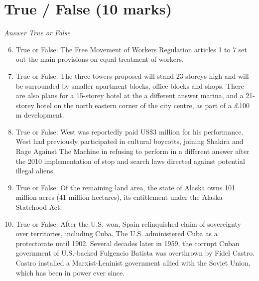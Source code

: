\documentclass[12pt]{article}
\begin{document}
\section*{True / False (10 marks)}
\textit{Answer True or False}
\begin{enumerate}[label=\arabic*.]
\setcounter{enumi}{5}
\item True or False: The Free Movement of Workers Regulation articles 1 to 7 set out the main provisions on equal treatment of workers.
\item True or False: The three towers proposed will stand 23 storeys high and will be surrounded by smaller apartment blocks, office blocks and shops. There are also plans for a 15-storey hotel at the a different answer marina, and a 21-storey hotel on the north eastern corner of the city centre, as part of a £100 m development.
\item True or False: West was reportedly paid US\$3 million for his performance. West had previously participated in cultural boycotts, joining Shakira and Rage Against The Machine in refusing to perform in a different answer after the 2010 implementation of stop and search laws directed against potential illegal aliens.
\item True or False: Of the remaining land area, the state of Alaska owns 101 million acres (41 million hectares), its entitlement under the Alaska Statehood Act.
\item True or False: After the U.S. won, Spain relinquished claim of sovereignty over territories, including Cuba. The U.S. administered Cuba as a protectorate until 1902. Several decades later in 1959, the corrupt Cuban government of U.S.-backed Fulgencio Batista was overthrown by Fidel Castro. Castro installed a Marxist-Leninist government allied with the Soviet Union, which has been in power ever since.
\end{enumerate}
\end{document}
